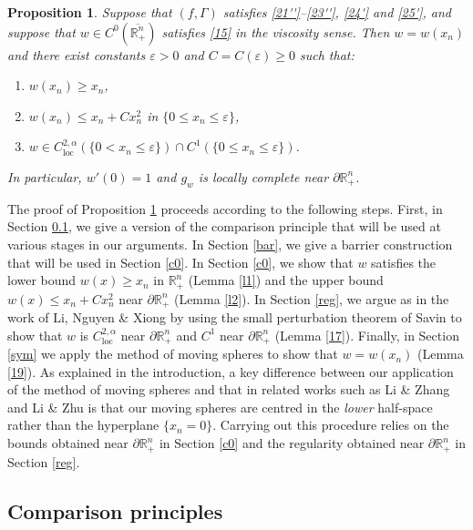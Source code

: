 \documentclass[12pt]{article}
\numberwithin{equation}{section}
\theoremstyle{plain}
\newtheorem{prop}[thm]{Proposition}
\theoremstyle{definition}
\newcommand{\ep}{\varepsilon}
\begin{document}
\begin{prop}\label{A'}
	Suppose that $(f,\Gamma)$ satisfies \eqref{21''}--\eqref{23''}, \eqref{24'} and \eqref{25'}, and suppose that $w\in C^0(\overline{\mathbb{R}_+^n})$ satisfies \eqref{15} in the viscosity sense. Then $w = w(x_n)$ and there exist constants $\ep>0$ and $C = C(\ep) \geq 0$ such that:\smallskip
	\begin{enumerate}
		\item $w(x_n) \geq x_n$, \smallskip
		\item $w(x_n) \leq x_n + Cx_n^2$ in $\{0\leq x_n \leq \ep\}$,\smallskip
		\item $w\in C^{2,\alpha}_{\operatorname{loc}}(\{0<x_n \leq \ep\}) \cap C^1(\{0 \leq x_n \leq \ep\})$. \smallskip
	\end{enumerate} 
In particular, $w'(0) = 1$ and $g_w$ is locally complete near $\partial\mathbb{R}_+^n$. 
\end{prop}

The proof of Proposition \ref{A'} proceeds according to the following steps. First, in Section \ref{cp}, we give a version of the comparison principle that will be used at various stages in our arguments. In Section \ref{bar}, we give a barrier construction that will be used in Section \ref{c0}. In Section \ref{c0}, we show that $w$ satisfies the lower bound $w(x) \geq x_n$ in $\mathbb{R}_+^n$ (Lemma \ref{l1}) and the upper bound $w(x) \leq x_n + Cx_n^2$ near $\partial\mathbb{R}^n_+$ (Lemma \ref{l2}). In Section \ref{reg}, we argue as in the work of Li, Nguyen \& Xiong \cite{LNX22} by using the small perturbation theorem of Savin \cite{Sav07} to show that $w$ is $C^{2,\alpha}_{\operatorname{loc}}$ near $\partial\mathbb{R}^n_+$ and $C^1$ near $\partial\mathbb{R}^n_+$ (Lemma \ref{17}). Finally, in Section \ref{sym} we apply the method of moving spheres to show that $w=w(x_n)$ (Lemma \ref{19}). As explained in the introduction, a key difference between our application of the method of moving spheres and that in related works such as Li \& Zhang \cite{LZ03} and Li \& Zhu \cite{LZ95} is that our moving spheres are centred in the \textit{lower} half-space rather than the hyperplane $\{x_n=0\}$. Carrying out this procedure relies on the bounds obtained near $\partial\mathbb{R}^n_+$ in Section \ref{c0} and the regularity obtained near $\partial\mathbb{R}^n_+$ in Section \ref{reg}. 

\subsection{Comparison principles}\label{cp}
\end{document}
